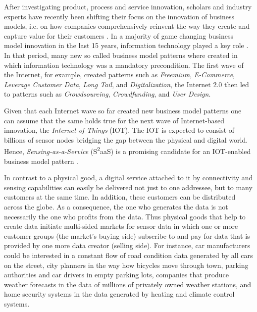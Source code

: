 After investigating product, process and service innovation, scholars and industry experts have recently been shifting their focus on the innovation of business models, i.e. on how companies comprehensively reinvent the way they create and capture value for their customers \cite{osterwalder2010business, zott2011business, pohle2006ibm, gassmann2013st,timmers1998business}. In a majority of game changing business model innovation in the last 15 years, information technology played a key role \cite{gassmann2013st}. In that period, many new so called business model patterns where created in which information technology was a mandatory precondition. The first wave of the Internet, for example, created patterns such as \emph{Freemium}, \emph{E-Commerce}, \emph{Leverage Customer Data}, \emph{Long Tail}, and \emph{Digitalization}, the Internet 2.0 then led to patterns such as \emph{Crowdsourcing}, \emph{Crowdfunding}, and \emph{User Design}. 

Given that each Internet wave so far created new business model patterns one can assume that the same holds true for the next wave of Internet-based innovation, the \emph{Internet of Things} (IOT). The IOT is expected to consist of billions of sensor nodes bridging the gap between the physical and digital world. Hence, \emph{Sensing-as-a-Service} (S\textsuperscript{2}aaS) is a promising candidate for an IOT-enabled business model pattern \cite{weinberger,perera2014sensing, mizouni2013mobile, sheng2013sensing}.  

In contrast to a physical good, a digital service attached to it by connectivity and sensing capabilities can easily be delivered not just to one addressee, but to many customers at the same time. In addition, these customers can be distributed across the globe. As a consequence, the one who generates the data is not necessarily the one who profits from the data. Thus physical goods that help to create data initiate multi-sided markets for sensor data in which one or more customer groups (the market’s buying side) subscribe to and pay for data that is provided by one more data creator (selling side). For instance, car manufacturers could be interested in a constant flow of road condition data generated by all cars on the street, city planners in the way how bicycles move through town, parking authorities and car drivers in empty parking lots, companies that produce weather forecasts in the data of millions of privately owned weather stations, and home security systems in the data generated by heating and climate control systems.

